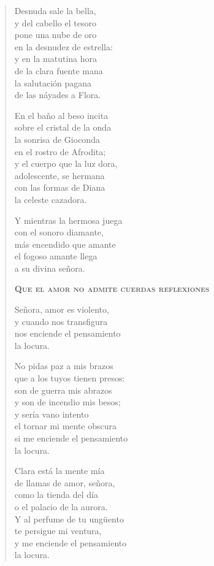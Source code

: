 \documentclass[12pt]{article}
\begin{document}
\begin{verse}
Desnuda sale la bella,\\
y del cabello el tesoro\\
pone una nube de oro\\
en la desnudez de estrella:\\
y en la matutina hora\\
de la clara fuente mana\\
la salutación pagana\\
de las náyades a Flora.  

En el baño al beso incita\\
sobre el cristal de la onda\\
la sonrisa de Gioconda\\
en el rostro de Afrodita;\\
y el cuerpo que la luz dora,\\
adolescente, se hermana\\
con las formas de Diana\\
la celeste cazadora.  

Y mientras la hermosa juega\\
con el sonoro diamante,\\
más encendido que amante\\
el fogoso amante llega\\
a su divina señora.  

{\bfseries\scshape {Que el amor no admite cuerdas reflexiones}}

Señora, amor es violento,\\
y cuando nos transfigura\\
nos enciende el pensamiento\\
la locura.  

No pidas paz a mis brazos\\
que a los tuyos tienen presos:\\
son de guerra mis abrazos\\
y son de incendio mis besos;\\
y sería vano intento\\
el tornar mi mente obscura\\
si me enciende el pensamiento\\
la locura.  

Clara está la mente mía\\
de llamas de amor, señora,\\
como la tienda del día\\
o el palacio de la aurora.\\
Y al perfume de tu ungüento\\
te persigue mi ventura,\\
y me enciende el pensamiento\\
la locura.  


\end{verse}
\end{document}
